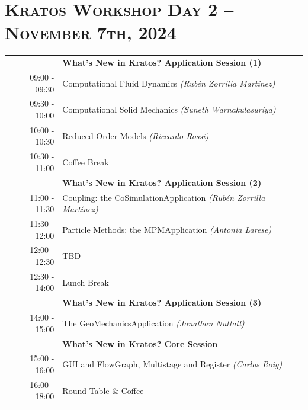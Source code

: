 \documentclass{article}
\begin{document}
\newpage
\section*{\centering \textsc{Kratos Workshop Day 2 -- November 7th, 2024}}

\begin{table}[h]\centering
   \begin{tabularx}{0.85\textwidth}{r|X}
      \toprule%
                    & {\large \textbf{What's New in Kratos? Application Session (1)}} \\%
      09:00 - 09:30 & Computational Fluid Dynamics \textit{(Rubén Zorrilla Martínez)}\\%
      09:30 - 10:00 & Computational Solid Mechanics \textit{(Suneth Warnakulasuriya)}\\%
      10:00 - 10:30 & Reduced Order Models \textit{(Riccardo Rossi)}\\%
      \midrule%
      \rowcolor{SeaGreen3!5!} 10:30 - 11:00 & Coffee Break \\%
      \midrule%
                    & {\large \textbf{What's New in Kratos? Application Session (2)}} \\%
      11:00 - 11:30 & Coupling: the CoSimulationApplication \textit{(Rubén Zorrilla Martínez)}\\%
      11:30 - 12:00 & Particle Methods: the MPMApplication \textit{(Antonia Larese)}\\%
      12:00 - 12:30 & TBD \\%
      \midrule%
      \rowcolor{SeaGreen3!5!} 12:30 - 14:00 & Lunch Break \\%
      \midrule%
                    & {\large \textbf{What's New in Kratos? Application Session (3)}} \\%
      14:00 - 15:00 & The GeoMechanicsApplication \textit{(Jonathan Nuttall)}\\%
      \midrule%
                    & {\large \textbf{What's New in Kratos? Core Session}} \\%
      15:00 - 16:00 & GUI and FlowGraph, Multistage and Register \textit{(Carlos Roig)}\\%
      \midrule%
      \rowcolor{SeaGreen3!5!} 16:00 - 18:00 & Round Table \& Coffee \\%
      \bottomrule
   \end{tabularx}
\end{table}
\end{document}
